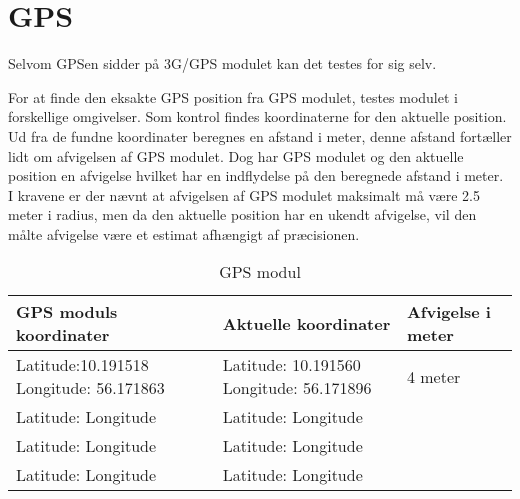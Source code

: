 \section{GPS}

Selvom GPSen sidder på 3G/GPS modulet kan det testes for sig selv. 

For at finde den eksakte GPS position fra GPS modulet, testes modulet i forskellige omgivelser. Som kontrol findes koordinaterne for den aktuelle position. Ud fra de fundne koordinater beregnes en afstand i meter, denne afstand fortæller lidt om afvigelsen af GPS modulet. Dog har GPS modulet og den aktuelle position en afvigelse hvilket har en indflydelse på den beregnede afstand i meter. I kravene er der nævnt at afvigelsen af GPS modulet maksimalt må være 2.5 meter i radius, men da den aktuelle position har en ukendt afvigelse, vil den målte afvigelse være et estimat afhængigt af præcisionen. 

\begin{table}[H]
\begin{tabular}{| p{4cm}| p{4cm}| p{3cm}|}
\hline
GPS moduls koordinater & Aktuelle koordinater & Afvigelse i meter\\\hline
Latitude:10.191518 \newline Longitude: 56.171863 & Latitude: 10.191560 \newline Longitude: 56.171896 & 4 meter\\\hline
Latitude: \newline Longitude & Latitude: \newline Longitude & \\\hline
Latitude: \newline Longitude & Latitude: \newline Longitude & \\\hline
Latitude: \newline Longitude & Latitude: \newline Longitude & \\\hline

\end{tabular}
\caption{GPS modul}
\label{tab:GPS_modul}
\end{table}

